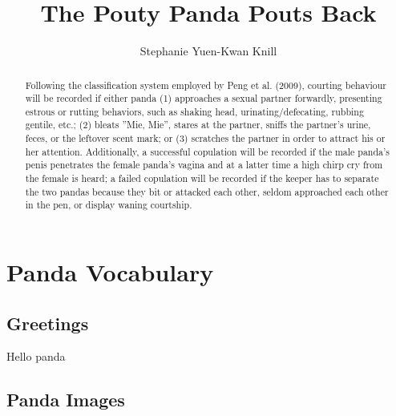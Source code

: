 \documentclass[11pt, oneside]{article}   	%
\title{The Pouty Panda Pouts Back}
\author{Stephanie Yuen-Kwan Knill}
\begin{document}
\maketitle

\begin{abstract}
Following the classification system employed by Peng et al. (2009), courting behaviour will be recorded if either panda (1) approaches a sexual partner forwardly, presenting estrous or rutting behaviors, such as shaking head, urinating/defecating, rubbing gentile, etc.; (2) bleats ''Mie, Mie'', stares at the partner, sniffs the partner's urine, feces, or the leftover scent mark; or (3) scratches the partner in order to attract his or her attention. Additionally, a successful copulation will be recorded if the male panda's penis penetrates the female panda's vagina and at a latter time a high chirp cry from the female is heard; a failed copulation will be recorded if the keeper has to separate the two pandas because they bit or attacked each other, seldom approached each other in the pen, or display waning courtship. 
\end{abstract}

\section{Panda Vocabulary}

\subsection{Greetings}
Hello panda

\subsection{Panda Images}
\end{document}
